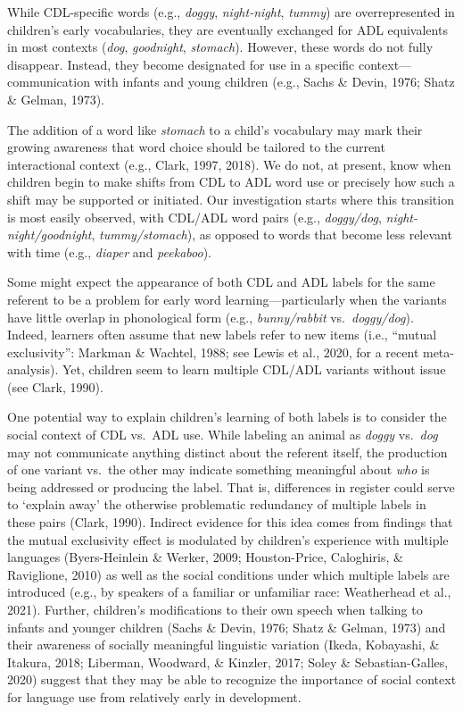 \documentclass[10pt, letterpaper]{article}
\begin{document}
While CDL-specific words (e.g., \emph{doggy}, \emph{night-night},
\emph{tummy}) are overrepresented in children's early vocabularies, they
are eventually exchanged for ADL equivalents in most contexts
(\emph{dog}, \emph{goodnight}, \emph{stomach}). However, these words do
not fully disappear. Instead, they become designated for use in a
specific context---communication with infants and young children (e.g.,
Sachs \& Devin, 1976; Shatz \& Gelman, 1973).

The addition of a word like \emph{stomach} to a child's vocabulary may
mark their growing awareness that word choice should be tailored to the
current interactional context (e.g., Clark, 1997, 2018). We do not, at
present, know when children begin to make shifts from CDL to ADL word
use or precisely how such a shift may be supported or initiated. Our
investigation starts where this transition is most easily observed, with
CDL/ADL word pairs (e.g., \emph{doggy/dog},
\emph{night-night/goodnight}, \emph{tummy/stomach}), as opposed to words
that become less relevant with time (e.g., \emph{diaper} and
\emph{peekaboo}).

Some might expect the appearance of both CDL and ADL labels for the same
referent to be a problem for early word learning---particularly when the
variants have little overlap in phonological form (e.g.,
\emph{bunny/rabbit} vs.~\emph{doggy/dog}). Indeed, learners often assume
that new labels refer to new items (i.e., {``mutual exclusivity''}:
Markman \& Wachtel, 1988; see Lewis et al., 2020, for a recent
meta-analysis). Yet, children seem to learn multiple CDL/ADL variants
without issue (see Clark, 1990).

One potential way to explain children's learning of both labels is to
consider the social context of CDL vs.~ADL use. While labeling an animal
as \emph{doggy} vs.~\emph{dog} may not communicate anything distinct
about the referent itself, the production of one variant vs.~the other
may indicate something meaningful about \emph{who} is being addressed or
producing the label. That is, differences in register could serve to
`explain away' the otherwise problematic redundancy of multiple labels
in these pairs (Clark, 1990). Indirect evidence for this idea comes from
findings that the mutual exclusivity effect is modulated by children's
experience with multiple languages (Byers-Heinlein \& Werker, 2009;
Houston-Price, Caloghiris, \& Raviglione, 2010) as well as the social
conditions under which multiple labels are introduced (e.g., by speakers
of a familiar or unfamiliar race: Weatherhead et al., 2021). Further,
children's modifications to their own speech when talking to infants and
younger children (Sachs \& Devin, 1976; Shatz \& Gelman, 1973) and their
awareness of socially meaningful linguistic variation (Ikeda, Kobayashi,
\& Itakura, 2018; Liberman, Woodward, \& Kinzler, 2017; Soley \&
Sebastian-Galles, 2020) suggest that they may be able to recognize the
importance of social context for language use from relatively early in
development.
\end{document}
